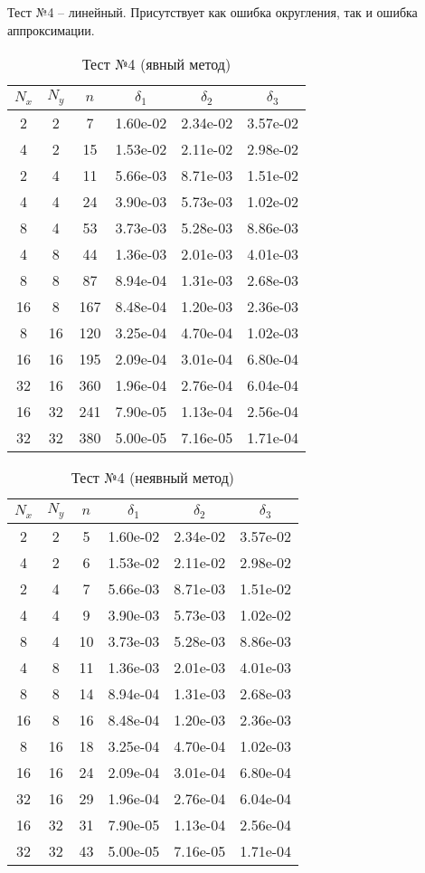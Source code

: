 \newpage
Тест №4 -- линейный. Присутствует как ошибка округления, так и ошибка аппроксимации.
\begin{table}[H]
	\centering
	\begin{tabular}{*6c}
		\toprule
		$N_x$ & $N_y$ & $n$ & $\delta_1$ & $\delta_2$ & $\delta_3$ \\
		\midrule
		2 & 2 & 7 & 1.60e-02 & 2.34e-02 & 3.57e-02 \\
		4 & 2 & 15 & 1.53e-02 & 2.11e-02 & 2.98e-02 \\
		2 & 4 & 11 & 5.66e-03 & 8.71e-03 & 1.51e-02 \\
		4 & 4 & 24 & 3.90e-03 & 5.73e-03 & 1.02e-02 \\
		8 & 4 & 53 & 3.73e-03 & 5.28e-03 & 8.86e-03 \\
		4 & 8 & 44 & 1.36e-03 & 2.01e-03 & 4.01e-03 \\
		8 & 8 & 87 & 8.94e-04 & 1.31e-03 & 2.68e-03 \\
		16 & 8 & 167 & 8.48e-04 & 1.20e-03 & 2.36e-03 \\
		8 & 16 & 120 & 3.25e-04 & 4.70e-04 & 1.02e-03 \\
		16 & 16 & 195 & 2.09e-04 & 3.01e-04 & 6.80e-04 \\
		32 & 16 & 360 & 1.96e-04 & 2.76e-04 & 6.04e-04 \\
		16 & 32 & 241 & 7.90e-05 & 1.13e-04 & 2.56e-04 \\
		32 & 32 & 380 & 5.00e-05 & 7.16e-05 & 1.71e-04 \\
		\bottomrule
	\end{tabular}
	\caption{Тест №4 (явный метод)}
\end{table}
\begin{table}[H]
	\centering
	\begin{tabular}{*6c}
		\toprule
		$N_x$ & $N_y$ & $n$ & $\delta_1$ & $\delta_2$ & $\delta_3$ \\
		\midrule
		2 & 2 & 5 & 1.60e-02 & 2.34e-02 & 3.57e-02 \\
		4 & 2 & 6 & 1.53e-02 & 2.11e-02 & 2.98e-02 \\
		2 & 4 & 7 & 5.66e-03 & 8.71e-03 & 1.51e-02 \\
		4 & 4 & 9 & 3.90e-03 & 5.73e-03 & 1.02e-02 \\
		8 & 4 & 10 & 3.73e-03 & 5.28e-03 & 8.86e-03 \\
		4 & 8 & 11 & 1.36e-03 & 2.01e-03 & 4.01e-03 \\
		8 & 8 & 14 & 8.94e-04 & 1.31e-03 & 2.68e-03 \\
		16 & 8 & 16 & 8.48e-04 & 1.20e-03 & 2.36e-03 \\
		8 & 16 & 18 & 3.25e-04 & 4.70e-04 & 1.02e-03 \\
		16 & 16 & 24 & 2.09e-04 & 3.01e-04 & 6.80e-04 \\
		32 & 16 & 29 & 1.96e-04 & 2.76e-04 & 6.04e-04 \\
		16 & 32 & 31 & 7.90e-05 & 1.13e-04 & 2.56e-04 \\
		32 & 32 & 43 & 5.00e-05 & 7.16e-05 & 1.71e-04 \\
		\bottomrule
	\end{tabular}
	\caption{Тест №4 (неявный метод)}
\end{table}

